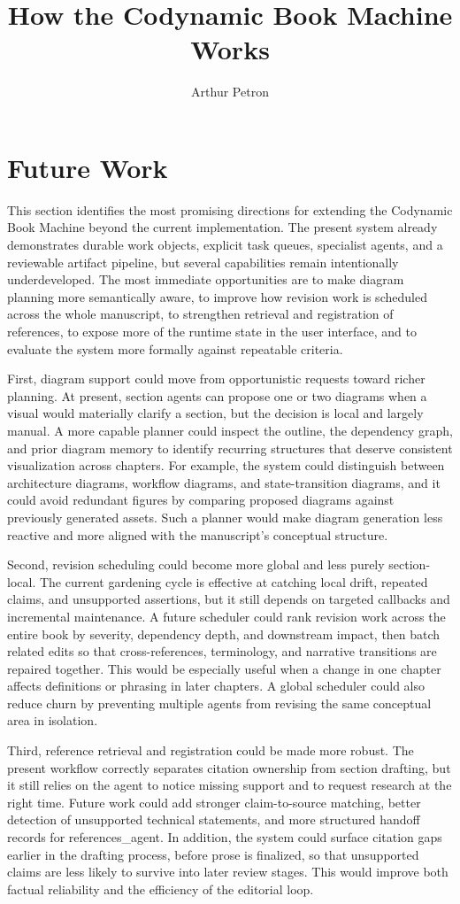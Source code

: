\documentclass[11pt]{article}
\title{How the Codynamic Book Machine Works}
\author{Arthur Petron}
\begin{document}
\section*{Future Work}

This section identifies the most promising directions for extending the Codynamic Book Machine beyond the current implementation. The present system already demonstrates durable work objects, explicit task queues, specialist agents, and a reviewable artifact pipeline, but several capabilities remain intentionally underdeveloped. The most immediate opportunities are to make diagram planning more semantically aware, to improve how revision work is scheduled across the whole manuscript, to strengthen retrieval and registration of references, to expose more of the runtime state in the user interface, and to evaluate the system more formally against repeatable criteria.

First, diagram support could move from opportunistic requests toward richer planning. At present, section agents can propose one or two diagrams when a visual would materially clarify a section, but the decision is local and largely manual. A more capable planner could inspect the outline, the dependency graph, and prior diagram memory to identify recurring structures that deserve consistent visualization across chapters. For example, the system could distinguish between architecture diagrams, workflow diagrams, and state-transition diagrams, and it could avoid redundant figures by comparing proposed diagrams against previously generated assets. Such a planner would make diagram generation less reactive and more aligned with the manuscript's conceptual structure.

Second, revision scheduling could become more global and less purely section-local. The current gardening cycle is effective at catching local drift, repeated claims, and unsupported assertions, but it still depends on targeted callbacks and incremental maintenance. A future scheduler could rank revision work across the entire book by severity, dependency depth, and downstream impact, then batch related edits so that cross-references, terminology, and narrative transitions are repaired together. This would be especially useful when a change in one chapter affects definitions or phrasing in later chapters. A global scheduler could also reduce churn by preventing multiple agents from revising the same conceptual area in isolation.

Third, reference retrieval and registration could be made more robust. The present workflow correctly separates citation ownership from section drafting, but it still relies on the agent to notice missing support and to request research at the right time. Future work could add stronger claim-to-source matching, better detection of unsupported technical statements, and more structured handoff records for references_agent. In addition, the system could surface citation gaps earlier in the drafting process, before prose is finalized, so that unsupported claims are less likely to survive into later review stages. This would improve both factual reliability and the efficiency of the editorial loop.
\end{document}
